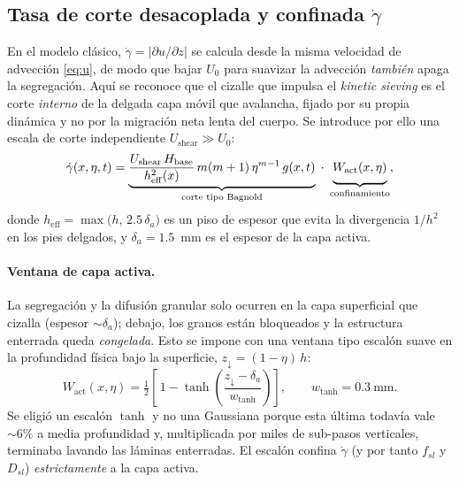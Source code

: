 \documentclass[11pt,a4paper]{article}
\begin{document}
\subsection{Tasa de corte desacoplada y confinada $\dot\gamma$}
En el modelo clásico, $\dot\gamma=|\partial u/\partial z|$ se calcula desde
la misma velocidad de advección \eqref{eq:u}, de modo que bajar $U_0$ para
suavizar la advección \emph{también} apaga la segregación. Aquí se
reconoce que el cizalle que impulsa el \emph{kinetic sieving} es el corte
\emph{interno} de la delgada capa móvil que avalancha, fijado por su
propia dinámica y no por la migración neta lenta del cuerpo. Se introduce
por ello una escala de corte independiente $U_{\mathrm{shear}}\gg U_0$:
\begin{equation}
    \dot\gamma(x,\eta,t) =
    \underbrace{\frac{U_{\mathrm{shear}}\,H_{\mathrm{base}}}{h_{\mathrm{eff}}^2(x)}\,m(m+1)\,\eta^{m-1}\,g(x,t)}_{\text{corte tipo Bagnold}}
    \;\cdot\;
    \underbrace{\vphantom{\frac{1}{h^2}}W_{\mathrm{act}}(x,\eta)}_{\text{confinamiento}},
    \label{eq:gammadot}
\end{equation}
donde $h_{\mathrm{eff}} = \max\!\big(h,\,2.5\,\delta_a\big)$ es un piso de
espesor que evita la divergencia $1/h^2$ en los pies delgados, y
$\delta_a=1.5$~mm es el espesor de la capa activa.

\paragraph{Ventana de capa activa.}
La segregación y la difusión granular solo ocurren en la capa superficial
que cizalla (espesor $\sim\delta_a$); debajo, los granos están bloqueados y
la estructura enterrada queda \emph{congelada}. Esto se impone con una
ventana tipo escalón suave en la profundidad física bajo la superficie,
$z_{\downarrow}=(1-\eta)\,h$:
\begin{equation}
    W_{\mathrm{act}}(x,\eta) = \tfrac12\left[\,1 - \tanh\!\left(\frac{z_{\downarrow}-\delta_a}{w_{\tanh}}\right)\right],
    \qquad w_{\tanh}=0.3~\text{mm}.
    \label{eq:Wact}
\end{equation}
Se eligió un escalón $\tanh$ y no una Gaussiana porque esta última todavía
vale $\sim6\%$ a media profundidad y, multiplicada por miles de sub-pasos
verticales, terminaba lavando las láminas enterradas. El escalón confina
$\dot\gamma$ (y por tanto $f_{sl}$ y $D_{sl}$) \emph{estrictamente} a la
capa activa.
\end{document}
